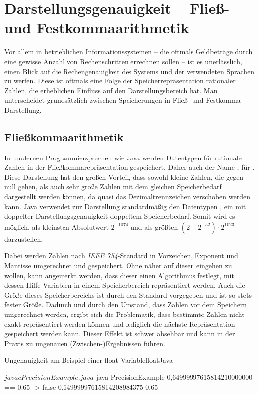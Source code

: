 \section{Darstellungsgenauigkeit -- Fließ- und Festkommaarithmetik}
Vor allem in betrieblichen Informationssystemen -- die oftmals Geldbeträge durch eine gewisse Anzahl von Rechenschritten errechnen sollen -- ist es unerlässlich, einen Blick auf die Rechengenauigkeit des Systems und der verwendeten Sprachen zu werfen. Diese ist oftmals eine Folge der Speicherrepräsentation rationaler Zahlen, die erheblichen Einfluss auf den Darstellungsbereich hat. Man unterscheidet grundsätzlich zwischen Speicherungen in Fließ- und Festkomma-Darstellung.
 
\subsection*{Fließkommaarithmetik}
In modernen Programmiersprachen wie Java werden Datentypen für rationale Zahlen in der Fließkommarepräsentation gespeichert. Daher auch der Name ; \engl für . Diese Darstellung hat den großen Vorteil, dass sowohl kleine Zahlen, die gegen null gehen, als auch sehr große Zahlen mit dem gleichen Speicherbedarf dargestellt werden können, da quasi das Dezimaltrennzeichen verschoben werden kann. Java verwendet zur Darstellung standardmäßig den Datentypen , ein  mit doppelter Darstellungsgenauigkeit \bzw doppeltem Speicherbedarf. Somit wird es möglich, als kleinsten Absolutwert $2^{-1074}$ und als größten $(2 - 2^{-52}) \cdot 2^{1023}$ darzustellen.

Dabei werden Zahlen nach \textit{IEEE 754}-Standard in Vorzeichen, Exponent und Mantisse umgerechnet und gespeichert. Ohne näher auf diesen eingehen zu wollen, kann angemerkt werden, dass dieser einen Algorithmus festlegt, mit dessen Hilfe Variablen in einem Speicherbereich repräsentiert werden. Auch die Größe dieses Speicherbereichs ist durch den Standard vorgegeben und ist so stets fester Größe. Dadurch und durch den Umstand, dass Zahlen vor dem Speichern umgerechnet werden, ergibt sich die Problematik, dass bestimmte Zahlen nicht exakt repräsentiert werden können und lediglich die nächste Repräsentation gespeichert werden kann. Dieser Effekt ist schwer absehbar und kann in der Praxis zu ungenauen (Zwischen-)Ergebnissen führen.

\begin{codeWithCaption}{Ungenauigkeit am Beispiel einer float-Variable}{floatJava}
    \begin{shellwindow}
    $ javac PrecisionExample.java 
    $ java PrecisionExample
    0,64999997615814210000000 == 0.65 -> false
    0.64999997615814208984375
    0.65
    \end{shellwindow}
\end{codeWithCaption}

